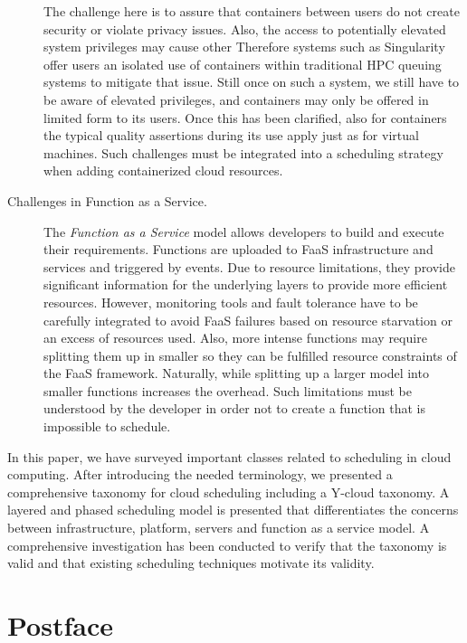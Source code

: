 \documentclass[final,5p,times,twocolumn]{elsarticle}
\begin{document}
\begin{description}
 The challenge here is to assure that containers between users do not create security or violate privacy issues. Also, the access to potentially elevated system privileges may cause other Therefore systems such as Singularity offer users an isolated use of containers within traditional HPC queuing systems to mitigate that issue. Still once on such a system, we still have to be aware of elevated privileges, and containers may only be offered in limited form to its users. Once this has been clarified, also for containers the typical quality assertions during its use apply just as for virtual machines. Such challenges must be integrated into a scheduling strategy when adding containerized cloud resources.


\item[Challenges in Function as a Service.] The {\em Function as a Service} model allows developers to build and execute their requirements. Functions are uploaded to FaaS infrastructure and services and triggered by events. Due to resource limitations, they provide significant information for the underlying layers to provide more efficient resources. However, monitoring tools and fault tolerance have to be carefully integrated to avoid FaaS failures based on resource starvation or an excess of resources used. Also, more intense functions may require splitting them up in smaller so they can be fulfilled resource constraints of the FaaS framework. Naturally, while splitting up a larger model into smaller functions increases the overhead. Such limitations must be understood by the developer in order not to create a function that is impossible to schedule.

\end{description}

\color{black}

In this paper, we have surveyed important classes related to scheduling in cloud computing. After introducing the needed terminology, we presented a comprehensive taxonomy for cloud scheduling including a Y-cloud taxonomy. A layered and phased scheduling model is presented that differentiates the concerns between infrastructure, platform, servers and function as a service model. A comprehensive investigation has been conducted to verify that the taxonomy is valid and that existing scheduling techniques motivate its validity.



\section*{Postface}
\end{document}
